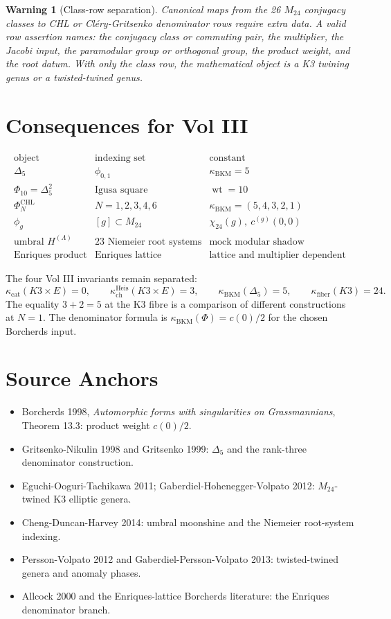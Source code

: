 \documentclass[11pt]{article}
\newtheorem{warning}[theorem]{Warning}
\providecommand{\kch}{\kappa_{\mathrm{ch}}}
\providecommand{\kcat}{\kappa_{\mathrm{cat}}}
\providecommand{\kBKM}{\kappa_{\mathrm{BKM}}}
\providecommand{\kfib}{\kappa_{\mathrm{fiber}}}
\providecommand{\wt}{\operatorname{wt}}
\providecommand{\Delf}{\Delta_5}
\providecommand{\PhiTen}{\Phi_{10}}
\begin{document}
\begin{warning}[Class-row separation]
Canonical maps from the 26 \(M_{24}\) conjugacy classes to CHL or
Cl\'ery-Gritsenko denominator rows require extra data.  A valid row
assertion names:
the conjugacy class or commuting pair, the multiplier, the Jacobi input,
the paramodular group or orthogonal group, the product weight, and the
root datum.  With only the class row, the mathematical object is a K3
twining genus or a twisted-twined genus.
\end{warning}

\section{Consequences for Vol III}

\[
\begin{array}{c|c|c}
\text{object} & \text{indexing set} & \text{constant}\\
\hline
\Delf & \phi_{0,1} & \kBKM=5\\
\PhiTen=\Delf^2 & \text{Igusa square} & \wt=10\\
\Phi_N^{\mathrm{CHL}} & N=1,2,3,4,6 & \kBKM=(5,4,3,2,1)\\
\phi_g & [g]\subset M_{24} & \chi_{24}(g),\ c^{(g)}(0,0)\\
\text{umbral }H^{(\Lambda)} & 23\text{ Niemeier root systems} &
\text{mock modular shadow}\\
\text{Enriques product} & \text{Enriques lattice} &
\text{lattice and multiplier dependent}
\end{array}
\]

The four Vol III invariants remain separated:
\[
  \kcat(K3\times E)=0,\qquad
  \kch^{\mathrm{Heis}}(K3\times E)=3,\qquad
  \kBKM(\Delf)=5,\qquad
  \kfib(K3)=24.
\]
The equality \(3+2=5\) at the K3 fibre is a comparison of different
constructions at \(N=1\).  The denominator formula is
\(\kBKM(\Phi)=c(0)/2\) for the chosen Borcherds input.

\section{Source Anchors}

\begin{itemize}
\item Borcherds 1998, \emph{Automorphic forms with singularities on
Grassmannians}, Theorem 13.3: product weight \(c(0)/2\).
\item Gritsenko-Nikulin 1998 and Gritsenko 1999: \(\Delf\) and the
rank-three denominator construction.
\item Eguchi-Ooguri-Tachikawa 2011; Gaberdiel-Hohenegger-Volpato
2012: \(M_{24}\)-twined K3 elliptic genera.
\item Cheng-Duncan-Harvey 2014: umbral moonshine and the Niemeier
root-system indexing.
\item Persson-Volpato 2012 and Gaberdiel-Persson-Volpato 2013:
twisted-twined genera and anomaly phases.
\item Allcock 2000 and the Enriques-lattice Borcherds literature:
the Enriques denominator branch.
\end{itemize}
\end{document}
